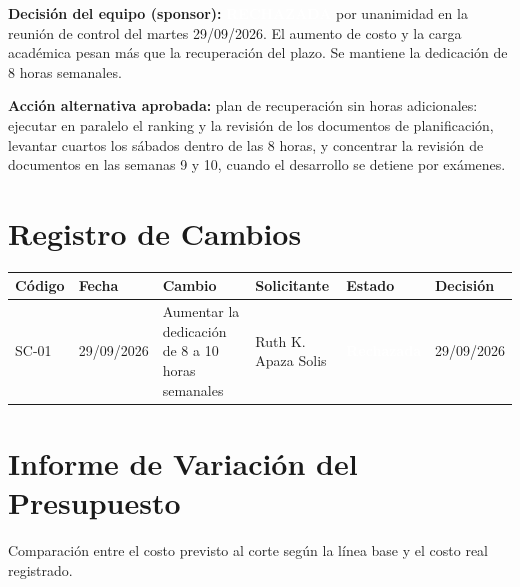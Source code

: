 \documentclass[11pt,a4paper]{article}
\newcommand{\etiqueta}[2]{{\setlength{\fboxsep}{2pt}\colorbox{#1}{\textcolor{white}{\scriptsize\bfseries #2}}}}
\begin{document}
\vspace{0.2cm}
\noindent\textbf{Decisión del equipo (sponsor):} \etiqueta{SevAlta}{RECHAZADA} por unanimidad en la reunión de control del martes 29/09/2026. El aumento de costo y la carga académica pesan más que la recuperación del plazo. Se mantiene la dedicación de 8 horas semanales.

\vspace{0.1cm}
\noindent\textbf{Acción alternativa aprobada:} plan de recuperación sin horas adicionales: ejecutar en paralelo el ranking y la revisión de los documentos de planificación, levantar cuartos los sábados dentro de las 8 horas, y concentrar la revisión de documentos en las semanas 9 y 10, cuando el desarrollo se detiene por exámenes.

\section{Registro de Cambios}
{\small
\noindent\begin{tabularx}{\textwidth}{@{}C{1.1cm} C{1.6cm} L P{2.0cm} C{1.6cm} C{1.6cm}@{}}
\toprule
{}
\textbf{Código} & \textbf{Fecha} & \textbf{Cambio} & \textbf{Solicitante} & \textbf{Estado} & \textbf{Decisión} \\
\midrule
SC-01 & 29/09/2026 & Aumentar la dedicación de 8 a 10 horas semanales & Ruth K. Apaza Solis & \etiqueta{SevAlta}{Rechazada} & 29/09/2026 \\
\bottomrule
\end{tabularx}
}

\section{Informe de Variación del Presupuesto}
Comparación entre el costo previsto al corte según la línea base y el costo real registrado.
\end{document}
